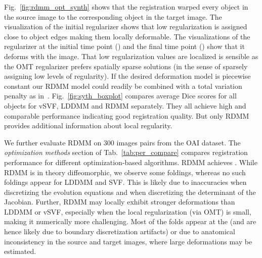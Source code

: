 \documentclass{article}
\numberwithin{equation}{section}
\newcommand{\zy}[1]{{\color{black}{#1}}}
\begin{document}
Fig.~\ref{fig:rdmm_opt_synth} shows that the registration warped every object in the source image to the corresponding object in the target image. The visualization of the initial regularizer shows that low regularization is assigned close to object edges making them locally deformable. The visualizations of the regularizer at the initial time point () and the final time point () show that it deforms with the image. That low regularization values are localized is sensible as the OMT regularizer prefers spatially sparse solutions (in the sense of sparsely assigning low levels of regularity). If the desired deformation model is piecewise constant our RDMM model could readily be combined with a total variation penalty as in~\citep{niethammer2019_cvpr}. Fig.~\ref{fig:syth_boxplot} compares average Dice scores for all objects for vSVF, LDDMM and RDMM separately. They all achieve high and comparable performance indicating good registration quality. But only RDMM provides additional information about local regularity.

We further evaluate RDMM on 300 images pairs from the OAI dataset. The {\it optimization methods} section of Tab.~\ref{tab:per_compare} compares registration performance for different optimization-based algorithms. RDMM achieves \zy{high performance}. While RDMM is in theory diffeomorphic, we observe some foldings, whereas no such foldings appear for LDDMM and SVF. This is likely due to inaccuracies when discretizing the evolution equations and when discretizing the determinant of the Jacobian. Further, RDMM may locally exhibit stronger deformations than LDDMM or vSVF, especially when the local regularization (via OMT) is small, making it numerically more challenging. Most of the folds appear at the \zy{image boundary} (and are hence likely due to boundary discretization artifacts) or due to anatomical inconsistency in the source and target images, where large deformations may be estimated.
\end{document}
